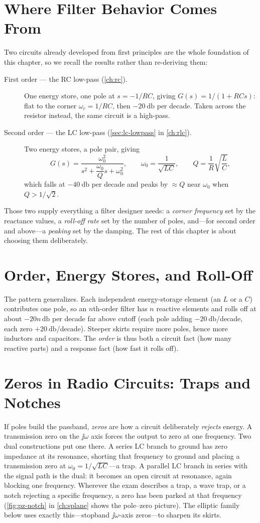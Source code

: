 \section{Where Filter Behavior Comes From}
Two circuits already developed from first principles are the whole foundation of
this chapter, so we recall the results rather than re-deriving them:
\begin{description}
\item[First order --- the RC low-pass (\cref{ch:rc}).] One energy store, one pole
at \(s=-1/RC\), giving \(G(s)=1/(1+RCs)\): flat to the corner
\(\omega_c=1/RC\), then \(-\SI{20}{\decibel}\) per decade. Taken across the
resistor instead, the same circuit is a high-pass.
\item[Second order --- the LC low-pass (\cref{sec:lc-lowpass} in
\cref{ch:rlc}).] Two energy stores, a pole pair, giving
\[
G(s)=\frac{\omega_0^2}{s^2+\dfrac{\omega_0}{Q}s+\omega_0^2},
\qquad
\omega_0=\frac{1}{\sqrt{LC}},
\qquad
Q=\frac{1}{R}\sqrt{\frac{L}{C}},
\]
which falls at \(-\SI{40}{\decibel}\) per decade and peaks by \(\approx Q\) near
\(\omega_0\) when \(Q>1/\sqrt2\).
\end{description}
Those two supply everything a filter designer needs: a \emph{corner frequency}
set by the reactance values, a \emph{roll-off rate} set by the number of poles,
and---for second order and above---a \emph{peaking} set by the damping. The rest
of this chapter is about choosing them deliberately.

\section{Order, Energy Stores, and Roll-Off}
The pattern generalizes. Each independent energy-storage element (an \(L\) or a
\(C\)) contributes one pole, so an \(n\)th-order filter has \(n\) reactive
elements and rolls off at about \(-20n\,\si{\decibel}\) per decade far above
cutoff (each pole adding \(-\SI{20}{\decibel}\)/decade, each zero
\(+\SI{20}{\decibel}\)/decade). Steeper skirts require more poles, hence more
inductors and capacitors. The \emph{order} is thus both a circuit fact (how many
reactive parts) and a response fact (how fast it rolls off).

\section{Zeros in Radio Circuits: Traps and Notches}
If poles build the passband, \emph{zeros} are how a circuit deliberately
\emph{rejects} energy. A transmission zero on the \(\jj\omega\) axis forces the
output to zero at one frequency. Two dual constructions put one there. A series LC
branch to ground has zero impedance at its resonance, shorting that frequency to
ground and placing a transmission zero at \(\omega_0=1/\sqrt{LC}\)---a trap. A
parallel LC branch in series with the signal path is the dual: it becomes an open
circuit at resonance, again blocking one frequency. Wherever the exam describes a
trap, a wave trap, or a notch rejecting a specific frequency, a zero has been
parked at that frequency (\cref{fig:pz-notch} in \cref{ch:splane} shows the
pole--zero picture). The elliptic family below uses exactly this---stopband
\(\jj\omega\)-axis zeros---to sharpen its skirts.

